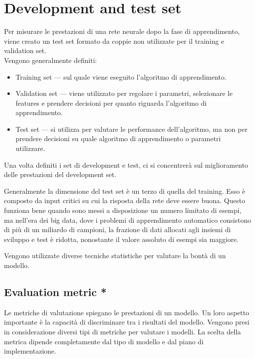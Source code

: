 \section{Development and test set}
\label{sec:DevelopmentAndTestSet}
Per misurare le prestazioni di una rete neurale dopo la fase di apprendimento, viene creato un test set formato da coppie non utilizzate per il training e validation set.\\
Vengono generalmente definiti: 
\begin{itemize}
	\item Training set --- sul quale viene eseguito l'algoritmo di apprendimento.
	\item Validation set --- viene utilizzato per regolare i parametri, selezionare le features e prendere decisioni per quanto riguarda l'algoritmo di apprendimento.
	\item Test set --- si utilizza per valutare le performance dell'algoritmo, ma non per prendere decisioni su quale algoritmo di apprendimento o parametri utilizzare. 
\end{itemize}

Una volta definiti i set di development e test, ci si concentrerà sul miglioramento delle prestazioni del development set. 

Generalmente la dimensione del test set è un terzo di quella del training. Esso è composto da input critici su cui la risposta della rete deve essere buona. 
Questo funziona bene quando sono messi a disposizione un numero limitato di esempi, ma nell'era dei big data, dove i problemi di apprendimento automatico consistono di più di un miliardo di campioni, la frazione di dati allocati agli insiemi di sviluppo e test è ridotta, nonostante il valore assoluto di esempi sia maggiore.

Vengono utilizzate diverse tecniche statistiche per valutare la bontà di un modello.

\subsection{Evaluation metric *}
\label{subsec:EvaluationMetric}

Le metriche di valutazione spiegano le prestazioni di un modello. Un loro aspetto importante è la capacità di discriminare tra i risultati del modello.
Vengono presi in considerazione diversi tipi di metriche per valutare i modelli. La scelta della metrica dipende completamente dal tipo di modello e dal piano di implementazione. 
\\

